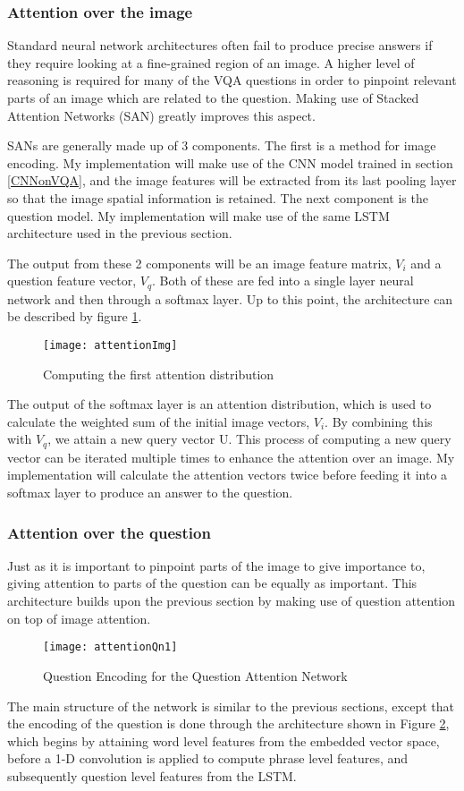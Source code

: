 \documentclass[12pt,a4paper,twoside]{article}
\begin{document}
\subsubsection{Attention over the image}
Standard neural network architectures often fail to produce precise answers if they require looking at a fine-grained region of an image. A higher level of reasoning is required for many of the VQA questions in order to pinpoint relevant parts of an image which are related to the question. Making use of Stacked Attention Networks (SAN) greatly improves this aspect\cite{SAN}.

SANs are generally made up of 3 components. The first is a method for image encoding. My implementation will make use of the CNN model trained in section \ref{CNNonVQA}, and the image features will be extracted from its last pooling layer so that the image spatial information is retained. The next component is the question model. My implementation will make use of the same LSTM architecture used in the previous section.

The output from these 2 components will be an image feature matrix, $V_i$ and a question feature vector, $V_q$. Both of these are fed into a single layer neural network and then through a softmax layer. Up to this point, the architecture can be described by figure \ref{fig:attentionimg}.
\begin{figure}[h]
\centering
\texttt{[image: attentionImg]}
\caption{Computing the first attention distribution}
\label{fig:attentionimg}
\end{figure}


The output of the softmax layer is an attention distribution, which is used to calculate the weighted sum of the initial image vectors, $V_i$. By combining this with $V_q$, we attain a new query vector U. This process of computing a new query vector can be iterated multiple times to enhance the attention over an image. My implementation will calculate the attention vectors twice before feeding it into a softmax layer to produce an answer to the question.

\subsubsection{Attention over the question}
Just as it is important to pinpoint parts of the image to give importance to, giving attention to parts of the question can be equally as important\cite{coAtt}. This architecture builds upon the previous section by making use of question attention on top of image attention. 
\begin{figure}[h]
\centering
\texttt{[image: attentionQn1]}
\caption{Question Encoding for the Question Attention Network}
\label{fig:attentionqn1}
\end{figure}
The main structure of the network is similar to the previous sections, except that the encoding of the question is done through the architecture shown in Figure \ref{fig:attentionqn1}, which begins by attaining word level features from the embedded vector space, before a 1-D convolution is applied to compute phrase level features, and subsequently question level features from the LSTM. 
\end{document}
